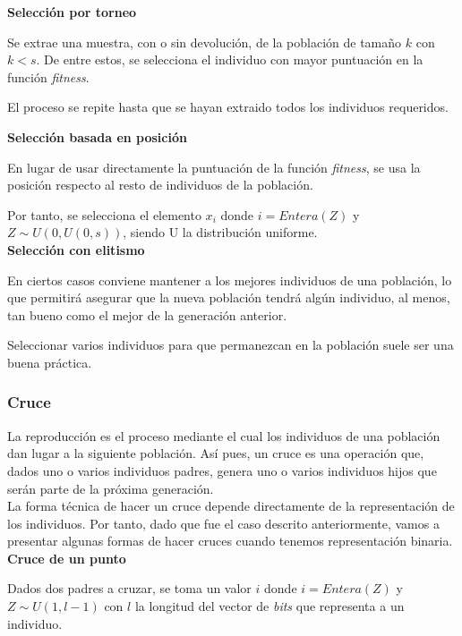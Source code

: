 			\textbf{Selecci\'on por torneo}
			
			Se extrae una muestra, con o sin devoluci\'on, de la poblaci\'on de tama\~no $k$ con $k<s$. De entre estos, se selecciona el individuo con mayor puntuaci\'on en la funci\'on \textit{fitness}.
			
			El proceso se repite hasta que se hayan extraido todos los individuos requeridos.
			
			\textbf{Selecci\'on basada en posición}
			
			En lugar de usar directamente la puntuaci\'on de la funci\'on \textit{fitness}, se usa la posici\'on respecto al resto de individuos de la poblaci\'on.
			
			Por tanto, se selecciona el elemento $x_i$ donde $i=Entera(Z)$ y $Z\sim U(0,U(0,s))$, siendo U la distribuci\'on uniforme.\\
			
			\textbf{Selecci\'on con elitismo}
			
			En ciertos casos conviene mantener a los mejores individuos de una poblaci\'on, lo que permitir\'a asegurar que la nueva poblaci\'on tendr\'a alg\'un individuo, al menos, tan bueno como el mejor de la generaci\'on anterior.
			
			Seleccionar varios individuos para que permanezcan en la poblaci\'on suele ser una buena pr\'actica.
			
			\subsubsection{Cruce}
			
			La reproducci\'on es el proceso mediante el cual los individuos de una poblaci\'on dan lugar a la siguiente poblaci\'on. As\'i pues, un cruce es una operaci\'on que, dados uno o varios individuos padres, genera uno o varios individuos hijos que ser\'an parte de la pr\'oxima generaci\'on.\\
			
			La forma t\'ecnica de hacer un cruce depende directamente de la representaci\'on de los individuos. Por tanto, dado que fue el caso descrito anteriormente, vamos a presentar algunas formas de hacer cruces cuando tenemos representaci\'on binaria.\\
			
			\textbf{Cruce de un punto}
			
			Dados dos padres a cruzar, se toma un valor $i$ donde $i=Entera(Z)$ y $Z\sim U(1,l-1)$ con $l$ la longitud del vector de \textit{bits} que representa a un individuo. 
			

